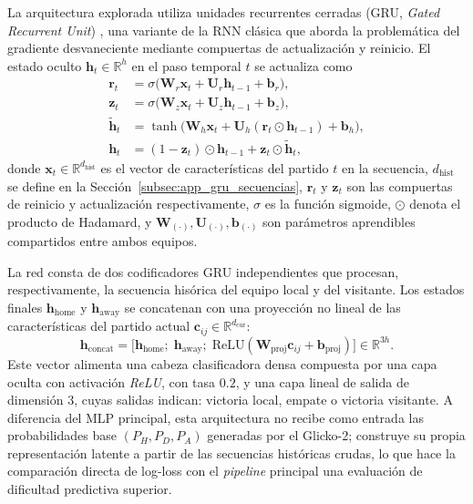 La arquitectura explorada utiliza unidades recurrentes cerradas (GRU, \emph{Gated Recurrent Unit}) \cite{Charu2018}, una variante de la RNN cl\'asica que aborda la problem\'atica del gradiente desvaneciente mediante compuertas de actualizaci\'on y reinicio. El estado oculto $\mathbf{h}_t\in\mathbb{R}^{h}$ en el paso temporal $t$ se actualiza como
\begin{align}
	\mathbf{r}_t &= \sigma\bigl(\boldsymbol{W}_r\mathbf{x}_t + \boldsymbol{U}_r\mathbf{h}_{t-1} + \mathbf{b}_r\bigr), \label{eq:gru_reset}\\
	\mathbf{z}_t &= \sigma\bigl(\boldsymbol{W}_z\mathbf{x}_t + \boldsymbol{U}_z\mathbf{h}_{t-1} + \mathbf{b}_z\bigr), \label{eq:gru_update}\\
	\tilde{\mathbf{h}}_t &= \tanh\bigl(\boldsymbol{W}_h\mathbf{x}_t + \boldsymbol{U}_h(\mathbf{r}_t\odot\mathbf{h}_{t-1}) + \mathbf{b}_h\bigr), \label{eq:gru_candidate}\\
	\mathbf{h}_t &= (1-\mathbf{z}_t)\odot\mathbf{h}_{t-1} + \mathbf{z}_t\odot\tilde{\mathbf{h}}_t, \label{eq:gru_state}
\end{align}
donde $\mathbf{x}_t\in\mathbb{R}^{d_{\mathrm{hist}}}$ es el vector de caracter\'isticas del partido $t$ en la secuencia, $d_{\mathrm{hist}}$ se define en la Secci\'on~\ref{subsec:app_gru_secuencias}, $\mathbf{r}_t$ y $\mathbf{z}_t$ son las compuertas de reinicio y actualizaci\'on respectivamente, $\sigma$ es la funci\'on sigmoide, $\odot$ denota el producto de Hadamard, y $\boldsymbol{W}_{(\cdot)},\boldsymbol{U}_{(\cdot)},\mathbf{b}_{(\cdot)}$ son par\'ametros aprendibles compartidos entre ambos equipos.

La red consta de dos codificadores GRU independientes que procesan, respectivamente, la secuencia his\'orica del equipo local y del visitante. Los estados finales $\mathbf{h}_{\mathrm{home}}$ y $\mathbf{h}_{\mathrm{away}}$ se concatenan con una proyecci\'on no lineal de las caracter\'isticas del partido actual $\mathbf{c}_{ij}\in\mathbb{R}^{d_{\mathrm{cur}}}$:
\begin{equation}
	\mathbf{h}_{\mathrm{concat}} = \bigl[\mathbf{h}_{\mathrm{home}};\;\mathbf{h}_{\mathrm{away}};\;\mathrm{ReLU}(\boldsymbol{W}_{\mathrm{proj}}\mathbf{c}_{ij}+\mathbf{b}_{\mathrm{proj}})\bigr]\in\mathbb{R}^{3h}.
	\label{eq:gru_concat}
\end{equation}
Este vector alimenta una cabeza clasificadora densa compuesta por una capa oculta con activaci\'on \textit{ReLU},  con tasa $0.2$, y una capa lineal de salida de dimensi\'on $3$, cuyas salidas indican: victoria local, empate o victoria visitante. A diferencia del MLP principal, esta arquitectura no recibe como entrada las probabilidades base $(P_H,P_D,P_A)$ generadas por el Glicko-2; construye su propia representaci\'on latente a partir de las secuencias hist\'oricas crudas, lo que hace la comparaci\'on directa de log-loss con el \textit{pipeline} principal una evaluaci\'on de dificultad predictiva superior.

